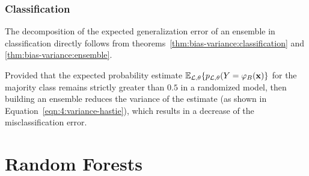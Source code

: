 \subsubsection{Classification}

The decomposition of the expected generalization error of an ensemble in
classification directly follows from theorems~\ref{thm:bias-variance:classification} and
\ref{thm:bias-variance:ensemble}.

Provided that the expected probability estimate $\mathbb{E}_{{\cal L},\theta}\{
p_{{\cal L},\theta}(Y=\varphi_B(\mathbf{x}) \}$ for the majority class remains
strictly greater than $0.5$ in a randomized model, then building an ensemble
reduces the variance of the estimate (as shown in Equation~\ref{eqn:4:variance-hastie}),
which results in a decrease of the misclassification error.

\section{Random Forests}
\label{sec:4:random-forests}








